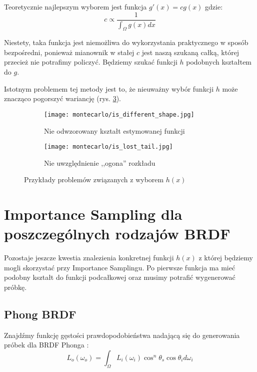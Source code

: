 \documentclass[../main.tex]{subfiles}
\begin{document}
Teoretycznie najlepszym wyborem jest funkcja $g'(x) = cg(x)$ gdzie:
\[
	c \propto \frac{1}{\int_{\Omega}{g(x)dx}}
\]

\noindent Niestety, taka funkcja jest niemożliwa do wykorzystania praktycznego w sposób bezpośredni, ponieważ mianownik w stałej $c$ jest naszą szukaną całką, której przecież nie potrafimy policzyć. Będziemy szukać funkcji $h$ podobnych kształtem do $g$.

Istotnym problemem tej metody jest to, że nieuważny wybór funkcji $h$ może
znacząco pogorszyć wariancję (rys. \ref{fig:ImportanceSamplingProblems}).

\begin{figure}
  \centering

  \begin{subfigure}[t]{0.45\textwidth}
    \texttt{[image: montecarlo/is\_different\_shape.jpg]}
    \label{fig:ImportanceSamplingWrongFunction}
    \caption{Nie odwzorowany kształt estymowanej funkcji}
  \end{subfigure}
  \begin{subfigure}[t]{0.45\textwidth}
    \centering
    \texttt{[image: montecarlo/is\_lost\_tail.jpg]}
    \label{fig:ImportanceSamplingLostTail}
    \caption{Nie uwzględnienie ,,ogona'' rozkładu}
  \end{subfigure}

  \caption{Przykłady problemów związanych z wyborem $h(x)$}
  \label{fig:ImportanceSamplingProblems}
\end{figure}

\section{Importance Sampling dla poszczególnych rodzajów BRDF}

Pozostaje jeszcze kwestia znalezienia konkretnej funkcji $h(x)$ z której będziemy mogli skorzystać przy Importance Samplingu. Po pierwsze funkcja ma mieć podobny kształt do funkcji podcałkowej oraz musimy potrafić wygenerować próbkę.

\subsection{Phong BRDF}

Znajdźmy funkcję gęstości prawdopodobieństwa nadającą się do generowania próbek dla BRDF Phonga \cite{NotesImportanceSampling,ImportanceSamplingForProduction}:
\[
  L_o(\omega_o) = \int_{\Omega} {
    L_i(\omega_i) \cos^{n}\theta_s \cos\theta_i d\omega_i
  }
\]
\end{document}
